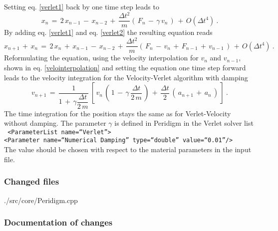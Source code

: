   Setting eq. \eqref{verlet1} back by one time step leads to
  \begin{equation}
   x_{n} \, = \, 2 \, x_{n-1} \, - \, x_{n-2} \, + \, \dfrac{\Delta t^2}{m} (\, F_n \, - \, \gamma \, v_n \, ) \, + \, O(\Delta t^4 ) ~.
  \label{verlet2}
  \end{equation}
  By adding eq. \eqref{verlet1} and eq. \eqref{verlet2} the resulting equation reads
  \begin{equation}
   x_{n+1} \, + \, x_n \, = \, 2 \, x_n \, + \, x_{n-1} \, - \, x_{n-2} \, + \, \dfrac{\Delta t^2}{m} (\, F_n \, - \, v_n \, + \, F_{n-1} \, + \, v_{n-1} \, ) \, + \, O(\Delta t^4 )~.
  \end{equation}
  Reformulating the equation, using the velocity interpolation for $v_n$ and $v_{n-1}$, shown in eq. \eqref{velointerpolation} and setting the equation one time step forward leads 
  to the velocity integration for the Velocity-Verlet algorithm with damping
  \begin{equation}
   v_{n+1} \, = \, \dfrac{1}{1 \, + \, \gamma \dfrac{\Delta t}{2 \, m}} \, [ \, v_n \, ( \, 1 \, - \, \gamma \, \dfrac{\Delta t}{2 \, m} \, ) \, + \, \dfrac{\Delta t}{2} \, 
   ( \, a_{n+1} \, + \, a_n \, ) \, ] ~.
  \end{equation}
  The time integration for the position stays the same as for Verlet-Velocity without damping. The parameter $\gamma$ is defined in Peridigm in the Verlet solver list \\ 
  \texttt{
  	<ParameterList name=``Verlet''> \\
	<Parameter name=``Numerical Damping'' type=``double'' value=``0.01''/> \\
  }
  The value should be chosen with respect to the material parameters in the input file.

\subsubsection{Changed files}
\begin{code}
./src/core/Peridigm.cpp
\end{code}
\subsubsection{Documentation of changes}
